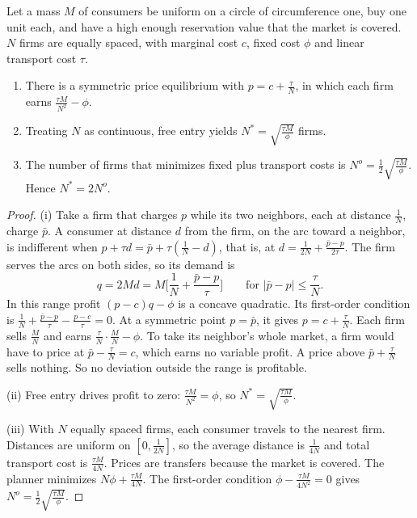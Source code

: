 \begin{proposition}\label{prop:04-salop}
Let a mass $M$ of consumers be uniform on a circle of circumference one, buy one unit each, and have a high enough
reservation value that the market is covered. $N$ firms are equally spaced, with marginal cost $c$, fixed cost
$\phi$ and linear transport cost $\tau$.
\begin{enumerate}[label=(\roman*)]
\item There is a symmetric price equilibrium with $p = c + \frac{\tau}{N}$, in which each firm earns
$\frac{\tau M}{N^2} - \phi$.
\item Treating $N$ as continuous, free entry yields $N^* = \sqrt{\frac{\tau M}{\phi}}$ firms.
\item The number of firms that minimizes fixed plus transport costs is $N^o = \frac{1}{2}\sqrt{\frac{\tau M}{\phi}}$.
Hence $N^* = 2N^o$.
\end{enumerate}
\end{proposition}

\begin{proof}
(i) Take a firm that charges $p$ while its two neighbors, each at distance $\frac{1}{N}$, charge $\bar p$. A consumer
at distance $d$ from the firm, on the arc toward a neighbor, is indifferent when
$p + \tau d = \bar p + \tau(\frac{1}{N} - d)$, that is, at $d = \frac{1}{2N} + \frac{\bar p - p}{2\tau}$. The firm serves
the arcs on both sides, so its demand is
\begin{equation*}
q = 2Md = M\Big[\frac{1}{N} + \frac{\bar p - p}{\tau}\Big] \qquad\text{for } |\bar p - p| \le \frac{\tau}{N}.
\end{equation*}
In this range profit $(p - c)q - \phi$ is a concave quadratic. Its first-order condition is
$\frac{1}{N} + \frac{\bar p - p}{\tau} - \frac{p - c}{\tau} = 0$. At a symmetric point $p = \bar p$, it gives
$p = c + \frac{\tau}{N}$. Each firm sells $\frac{M}{N}$ and earns $\frac{\tau}{N}\cdot\frac{M}{N} - \phi$. To take its
neighbor's whole market, a firm would have to price at $\bar p - \frac{\tau}{N} = c$, which earns no variable profit.
A price above $\bar p + \frac{\tau}{N}$ sells nothing. So no deviation outside the range is profitable.

(ii) Free entry drives profit to zero: $\frac{\tau M}{N^2} = \phi$, so $N^* = \sqrt{\frac{\tau M}{\phi}}$.

(iii) With $N$ equally spaced firms, each consumer travels to the nearest firm. Distances are uniform on
$[0, \frac{1}{2N}]$, so the average distance is $\frac{1}{4N}$ and total transport cost is $\frac{\tau M}{4N}$.
Prices are transfers because the market is covered. The planner minimizes $N\phi + \frac{\tau M}{4N}$. The
first-order condition $\phi - \frac{\tau M}{4N^2} = 0$ gives $N^o = \frac{1}{2}\sqrt{\frac{\tau M}{\phi}}$.
\end{proof}

